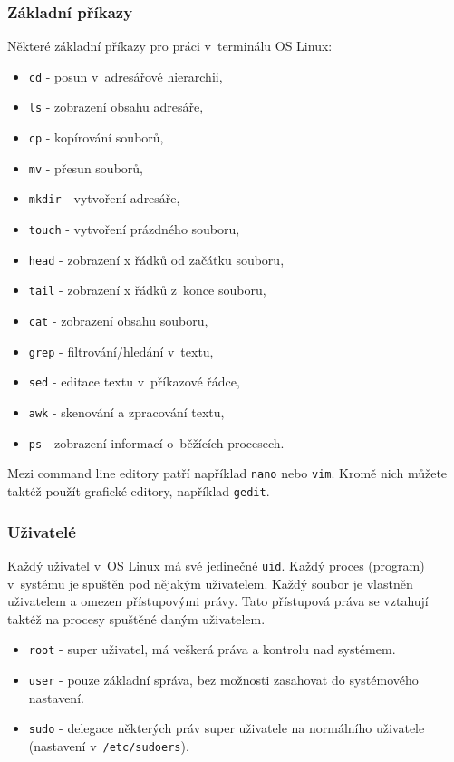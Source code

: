\subsubsection{Základní příkazy}
Některé základní příkazy pro práci v~terminálu OS Linux:
\begin{itemize}
				\item \texttt{cd} - posun v~adresářové hierarchii,
				\item \texttt{ls} - zobrazení obsahu adresáře,
				\item \texttt{cp} - kopírování souborů,
				\item \texttt{mv} - přesun souborů,
				\item \texttt{mkdir} - vytvoření adresáře,
				\item \texttt{touch} - vytvoření prázdného souboru,
				\item \texttt{head} - zobrazení x řádků od začátku souboru,
				\item \texttt{tail} - zobrazení x řádků z~konce souboru,
				\item \texttt{cat} - zobrazení obsahu souboru,
				\item \texttt{grep} - filtrování/hledání v~textu,
				\item \texttt{sed} - editace textu v~příkazové řádce,
				\item \texttt{awk} - skenování a zpracování textu,
				\item \texttt{ps} - zobrazení informací o~běžících procesech.
\end{itemize}

Mezi command line editory patří například \texttt{nano} nebo \texttt{vim}. Kromě nich můžete taktéž použít grafické editory, například \texttt{gedit}.

\subsubsection{Uživatelé}
Každý uživatel v~OS Linux má své jedinečné \texttt{uid}. Každý proces (program)
v~systému je spuštěn pod nějakým uživatelem. Každý soubor je vlastněn uživatelem
a omezen přístupovými právy. Tato přístupová práva se vztahují taktéž na procesy
spuštěné daným uživatelem.

\begin{itemize}
				\item \texttt{root} - super uživatel, má veškerá práva a kontrolu nad systémem.
				\item \texttt{user} - pouze základní správa, bez možnosti zasahovat do systémového nastavení.
				\item \texttt{sudo} - delegace některých práv super uživatele na normálního uživatele (nastavení v~\texttt{/etc/sudoers}).
\end{itemize}

